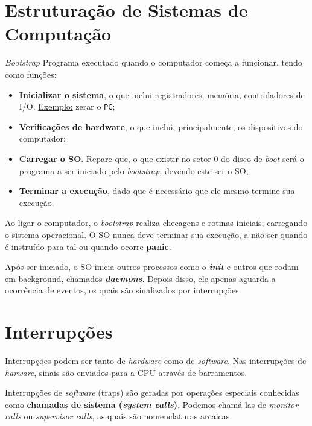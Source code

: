 \section{Estruturação de Sistemas de Computação}
\begin{definicao}{\textit{Bootstrap}}
  Programa executado quando o computador começa a funcionar, tendo como funções:
  \begin{itemize}
    \item \textbf{Inicializar o sistema}, o que inclui registradores, memória, controladores de I/O. \underline{Exemplo:} zerar o \texttt{PC};
    \item \textbf{Verificações de hardware}, o que inclui, principalmente, os dispositivos do computador;
    \item \textbf{Carregar o SO}. Repare que, o que existir no setor 0 do disco de \textit{boot} será o programa a ser iniciado pelo \textit{bootstrap}, devendo este ser o SO;
    \item \textbf{Terminar a execução}, dado que é necessário que ele mesmo termine sua execução.
  \end{itemize}
\end{definicao}

Ao ligar o computador, o \textit{bootstrap} realiza checagens e rotinas iniciais, carregando o sistema operacional. O SO nunca deve terminar sua execução, a não ser quando é instruído para tal ou quando ocorre \textbf{panic}.

Após ser iniciado, o SO inicia outros processos como o \textbf{\textit{init}} e outros que rodam em background, chamados \textbf{\textit{daemons}}. Depois disso, ele apenas aguarda a ocorrência de eventos, os quais são sinalizados por interrupções.


















\section{Interrupções}
Interrupções podem ser tanto de \textit{hardware} como de \textit{software}. Nas interrupções de \textit{harware}, sinais são enviados para a CPU através de barramentos.

Interrupções de \textit{software} (traps) são geradas por operações especiais conhecidas como \textbf{chamadas de sistema (\textit{system calls})}. Podemos chamá-las de \textit{monitor calls} ou \textit{supervisor calls}, as quais são nomenclaturas arcaicas.

